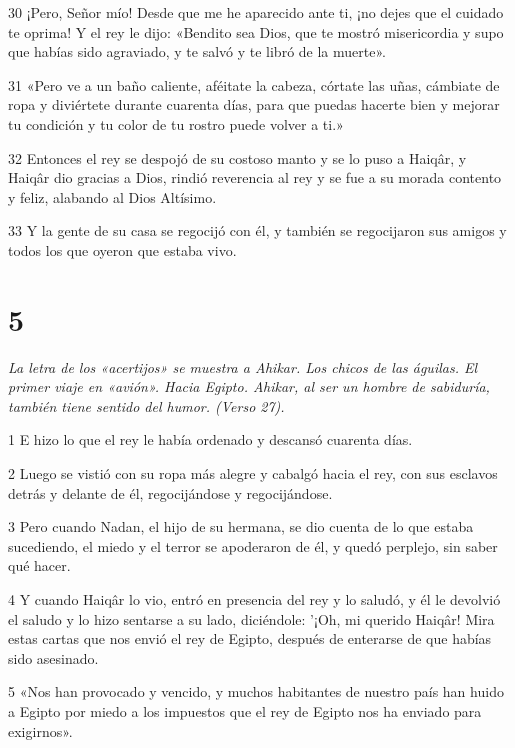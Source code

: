\par 30 ¡Pero, Señor mío! Desde que me he aparecido ante ti, ¡no dejes que el cuidado te oprima! Y el rey le dijo: «Bendito sea Dios, que te mostró misericordia y supo que habías sido agraviado, y te salvó y te libró de la muerte».

\par 31 «Pero ve a un baño caliente, aféitate la cabeza, córtate las uñas, cámbiate de ropa y diviértete durante cuarenta días, para que puedas hacerte bien y mejorar tu condición y tu color de tu rostro puede volver a ti.»

\par 32 Entonces el rey se despojó de su costoso manto y se lo puso a Haiqâr, y Haiqâr dio gracias a Dios, rindió reverencia al rey y se fue a su morada contento y feliz, alabando al Dios Altísimo.

\par 33 Y la gente de su casa se regocijó con él, y también se regocijaron sus amigos y todos los que oyeron que estaba vivo.

\chapter{5}

\par \textit{La letra de los «acertijos» se muestra a Ahikar. Los chicos de las águilas. El primer viaje en «avión». Hacia Egipto. Ahikar, al ser un hombre de sabiduría, también tiene sentido del humor. (Verso 27).}

\par 1 E hizo lo que el rey le había ordenado y descansó cuarenta días.

\par 2 Luego se vistió con su ropa más alegre y cabalgó hacia el rey, con sus esclavos detrás y delante de él, regocijándose y regocijándose.

\par 3 Pero cuando Nadan, el hijo de su hermana, se dio cuenta de lo que estaba sucediendo, el miedo y el terror se apoderaron de él, y quedó perplejo, sin saber qué hacer.

\par 4 Y cuando Haiqâr lo vio, entró en presencia del rey y lo saludó, y él le devolvió el saludo y lo hizo sentarse a su lado, diciéndole: '¡Oh, mi querido Haiqâr! Mira estas cartas que nos envió el rey de Egipto, después de enterarse de que habías sido asesinado.

\par 5 «Nos han provocado y vencido, y muchos habitantes de nuestro país han huido a Egipto por miedo a los impuestos que el rey de Egipto nos ha enviado para exigirnos».

